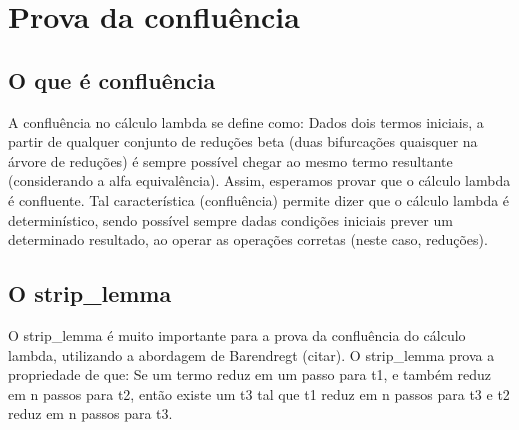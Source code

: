 \section{Prova da confluência}



\subsection{O que é confluência}



 A confluência no cálculo lambda se define como: Dados dois termos iniciais,
a partir de qualquer conjunto de reduções beta (duas bifurcações quaisquer na árvore de reduções)
 é sempre possível chegar ao mesmo termo resultante (considerando a alfa equivalência). 
Assim, esperamos provar que o cálculo lambda é confluente. Tal característica (confluência) 
permite dizer que o cálculo lambda é determinístico, sendo possível sempre dadas condições iniciais
prever um determinado resultado, ao operar as operações corretas (neste caso, reduções). 

\subsection{O strip\_lemma}



 O strip\_lemma é muito importante para a prova da confluência do cálculo lambda, utilizando
a abordagem de Barendregt (citar). O strip\_lemma prova a propriedade de que: Se um termo reduz em um
passo para t1, e também reduz em n passos para t2, então existe um t3 tal que t1 reduz em n passos para t3
e t2 reduz em n passos para t3. 


